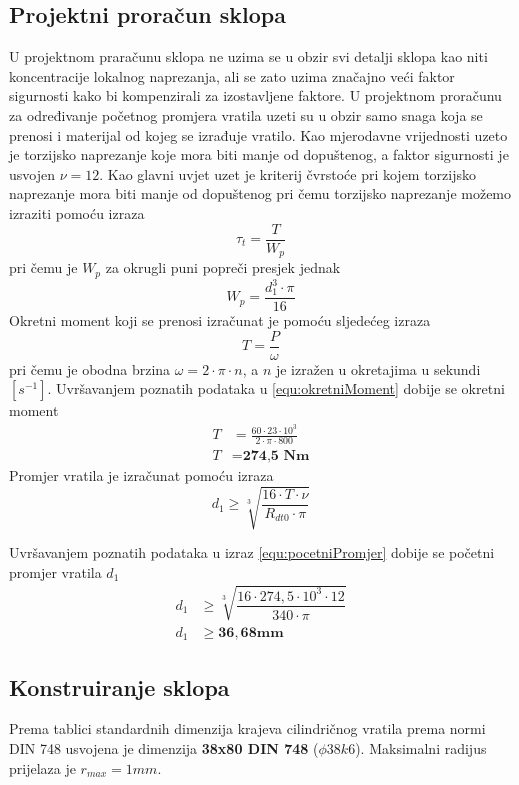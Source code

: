 \documentclass[11pt,a4paper]{article}
\begin{document}
\subsection{Projektni proračun sklopa}
U projektnom praračunu sklopa ne uzima se u obzir svi detalji sklopa kao niti koncentracije lokalnog naprezanja, ali se zato uzima značajno veći faktor sigurnosti kako bi kompenzirali za izostavljene faktore. U projektnom proračunu za određivanje početnog promjera vratila uzeti su u obzir samo snaga koja se prenosi i materijal od kojeg se izrađuje vratilo. Kao mjerodavne vrijednosti uzeto je torzijsko naprezanje koje mora biti manje od dopuštenog, a faktor sigurnosti je usvojen $\nu=12$.
Kao glavni uvjet uzet je kriterij čvrstoće pri kojem torzijsko naprezanje mora biti manje od dopuštenog pri čemu torzijsko naprezanje možemo izraziti pomoću izraza
\begin{equation}
\tau_t=\dfrac{T}{W_p}\label{equ:tangencijalnoNaprezanje}
\end{equation}
pri čemu je $W_p$ za okrugli puni popreči presjek jednak
\begin{equation}
W_p=\frac{d_1^3 \cdot \pi}{16}
\end{equation}
Okretni moment koji se prenosi izračunat je pomoću sljedećeg izraza
\begin{equation}
T=\frac{P}{\omega}\label{equ:okretniMoment}
\end{equation}
pri čemu je obodna brzina $\omega=2 \cdot \pi \cdot n$, a $n$ je izražen u okretajima u sekundi $[s^{-1}]$.
Uvršavanjem poznatih podataka u \eqref{equ:okretniMoment} dobije se okretni moment
\begin{align*}
T&=\frac{60 \cdot 23 \cdot 10^3}{2 \cdot \pi \cdot 800}\\
T&=\textbf{274,5 Nm}
\end{align*}
Promjer vratila je izračunat pomoću izraza
\begin{equation}
d_1 \geq \sqrt[3]{\dfrac{16 \cdot T \cdot \nu}{R_{dt0} \cdot \pi}} \label{equ:pocetniPromjer}
\end{equation}

Uvršavanjem poznatih podataka u izraz \eqref{equ:pocetniPromjer} dobije se početni promjer vratila $d_1$
\begin{align*}
d_1&\geq \sqrt[3]{\dfrac{16 \cdot 274,5\cdot 10^3 \cdot 12}{340 \cdot \pi}}\\
d_1&\geq \mathbf{36,68 mm} 
\end{align*}

\subsection{Konstruiranje sklopa}
Prema tablici standardnih dimenzija krajeva cilindričnog vratila prema normi DIN 748 usvojena je dimenzija \textbf{38x80 DIN 748} ($\phi38k6$). Maksimalni radijus prijelaza je $r_{max}=1 mm$.
\end{document}
